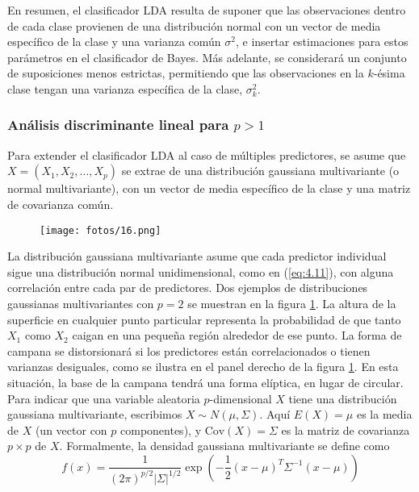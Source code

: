 En resumen, el clasificador LDA resulta de suponer que las observaciones dentro de cada clase provienen de una distribución normal con un vector de media específico de la clase y una varianza común $\sigma^2$, e insertar estimaciones para estos parámetros en el clasificador de Bayes. Más adelante, se considerará un conjunto de suposiciones menos estrictas, permitiendo que las observaciones en la $k$-ésima clase tengan una varianza específica de la clase, $\sigma^2_k$.

\subsubsection{Análisis discriminante lineal para $p > 1$}

Para extender el clasificador LDA al caso de múltiples predictores, se asume que $X = (X_1, X_2, \ldots, X_p)$ se extrae de una distribución gaussiana multivariante (o normal multivariante), con un vector de media específico de la clase y una matriz de covarianza común. \\

\begin{figure}[h]
\centering
\texttt{[image: fotos/16.png]}
\caption{}
\label{fig:4.5}
\end{figure}

La distribución gaussiana multivariante asume que cada predictor individual sigue una distribución normal unidimensional, como en (\ref{eq:4.11}), con alguna correlación entre cada par de predictores. Dos ejemplos de distribuciones gaussianas multivariantes con $p = 2$ se muestran en la figura \ref{fig:4.5}. La altura de la superficie en cualquier punto particular representa la probabilidad de que tanto $X_1$ como $X_2$ caigan en una pequeña región alrededor de ese punto. La forma de campana se distorsionará si los predictores están correlacionados o tienen varianzas desiguales, como se ilustra en el panel derecho de la figura \ref{fig:4.5}. En esta situación, la base de la campana tendrá una forma elíptica, en lugar de circular. Para indicar que una variable aleatoria $p$-dimensional $X$ tiene una distribución gaussiana multivariante, escribimos $X \sim N(\mu, \Sigma)$. Aquí $E(X) = \mu$ es la media de $X$ (un vector con $p$ componentes), y $\text{Cov}(X) = \Sigma$ es la matriz de covarianza $p \times p$ de $X$. Formalmente, la densidad gaussiana multivariante se define como
\begin{equation}
f(x) = \frac{1}{(2\pi)^{p/2} |\Sigma|^{1/2}} \exp\left(-\frac{1}{2}(x - \mu)^T \Sigma^{-1} (x - \mu)\right)
\label{eq:4.18}
\end{equation}

